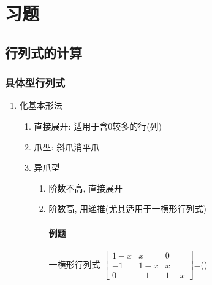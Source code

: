 \section{习题}
\subsection{行列式的计算}
\subsubsection{具体型行列式}
\begin{enumerate}
\item 化基本形法
\begin{enumerate}
\item 直接展开: 适用于含$ 0 $较多的行(列)
\item 爪型: 斜爪消平爪
\item 异爪型
\begin{enumerate}
\item 阶数不高, 直接展开
\item 阶数高, 用递推(尤其适用于一横形行列式)\par
\paragraph{例题} 一横形行列式
$\begin{bmatrix}
 1-x & x & 0 \\
 -1 & 1-x & x \\
 0 & -1 & 1-x
\end{bmatrix}$=(\qquad)

\end{enumerate}
\end{enumerate}
\end{enumerate}
